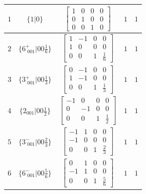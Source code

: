 \documentclass[fleqn,8pt]{jsarticle}
\begin{document}
\begin{longtable}{ccccc}
$ 1 $ & $ \{1|0\} $ & $ \begin{bmatrix} 1 & 0 & 0 & 0 \\ 0 & 1 & 0 & 0 \\ 0 & 0 & 1 & 0 \end{bmatrix} $ & $ 1 $ & $ 1 $ \\ \hline
$ 2 $ & $ \{6^{+}_{\,\,001}|0 0 \frac{1}{6}\} $ & $ \begin{bmatrix} 1 & -1 & 0 & 0 \\ 1 & 0 & 0 & 0 \\ 0 & 0 & 1 & \frac{1}{6} \end{bmatrix} $ & $ 1 $ & $ 1 $ \\ \hline
$ 3 $ & $ \{3^{+}_{\,\,001}|0 0 \frac{1}{3}\} $ & $ \begin{bmatrix} 0 & -1 & 0 & 0 \\ 1 & -1 & 0 & 0 \\ 0 & 0 & 1 & \frac{1}{3} \end{bmatrix} $ & $ 1 $ & $ 1 $ \\ \hline
$ 4 $ & $ \{2{}_{001}|0 0 \frac{1}{2}\} $ & $ \begin{bmatrix} -1 & 0 & 0 & 0 \\ 0 & -1 & 0 & 0 \\ 0 & 0 & 1 & \frac{1}{2} \end{bmatrix} $ & $ 1 $ & $ 1 $ \\ \hline
$ 5 $ & $ \{3^{-}_{\,\,001}|0 0 \frac{2}{3}\} $ & $ \begin{bmatrix} -1 & 1 & 0 & 0 \\ -1 & 0 & 0 & 0 \\ 0 & 0 & 1 & \frac{2}{3} \end{bmatrix} $ & $ 1 $ & $ 1 $ \\ \hline
$ 6 $ & $ \{6^{-}_{\,\,001}|0 0 \frac{5}{6}\} $ & $ \begin{bmatrix} 0 & 1 & 0 & 0 \\ -1 & 1 & 0 & 0 \\ 0 & 0 & 1 & \frac{5}{6} \end{bmatrix} $ & $ 1 $ & $ 1 $ \\
\end{longtable}
\end{document}
